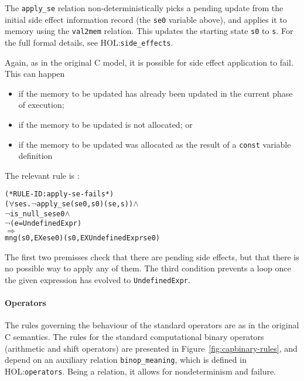 \documentclass[11pt]{article}
\newcommand{\HOLfile}[1]{HOL:\texttt{#1}}
\begin{document}
 The
\texttt{apply_se} relation non-deterministically picks a pending
update from the initial side effect information record (the
\texttt{se0} variable above), and applies it to memory using the
\texttt{val2mem} relation.%
%
This updates the starting state \texttt{s0} to \texttt{s}.
For the full formal details, see \HOLfile{side_effects}.

Again, as in the original C model, it is possible for side effect
application to fail.  This can happen
\begin{itemize}
\item if the memory to be updated has already been updated in the current
  phase of execution;
\item if the memory to be updated is not allocated; or
\item if the memory to be updated was allocated as the result of a
  \texttt{const} variable definition
\end{itemize}
The relevant rule is :
%
\begin{alltt}
(* RULE-ID: apply-se-fails *)
     (\(\forall\)se s. \(\neg\)apply_se (se0, s0) (se, s)) \(\land\)
     \(\neg\)is_null_se se0 \(\land\)
     \(\neg\)(e = UndefinedExpr)
   \(\Rightarrow\)
     mng (s0, EX e se0) (s0, EX UndefinedExpr se0)
\end{alltt}
The first two premisses check that there are pending side effects, but
that there is no possible way to apply any of them.  The third
condition prevents a loop once the given expression has evolved to
\texttt{UndefinedExpr}.

\paragraph{Operators} The rules governing the behaviour of the
standard operators are as in the original C semantics.  The rules for
the standard computational binary operators (arithmetic and shift
operators) are presented in Figure~\ref{fig:capbinary-rules}, and
depend on an auxiliary relation \texttt{binop_meaning}, which is
defined in \HOLfile{operators}.  Being a relation, it allows for
nondeterminism and failure.
\end{document}
